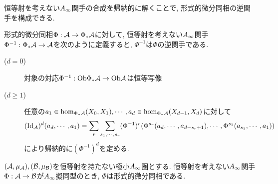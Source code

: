 \documentclass[uplatex, a4paper, 14Q, dvipdfmx]{jsarticle}
\begin{document}

恒等射を考えない$A_{\infty}$関手の合成を帰納的に解くことで, 形式的微分同相の逆関手を構成できる. 

\begin{lemma} \label{prop_diffeomorphism_has_inverse}
  形式的微分同相$\Phi: \mathcal{A} \to \Phi_\ast \mathcal{A}$に対して, 恒等射を考えない$A_{\infty}$関手$\Phi^{-1} : \Phi_\ast \mathcal{A} \to \mathcal{A}$を次のように定義すると, $\Phi^{-1}$は$\Phi$の逆関手である.
  \begin{description}
    \item[($d=0$)] 対象の対応$\Phi^{-1} : \mathrm{Ob}\Phi_\ast \mathcal{A} \to \mathrm{Ob}\mathcal{A}$は恒等写像
    \item[($d \geq 1$)] 任意の$a_1 \in \hom_{\Phi_\ast \mathcal{A}}(X_0,X_1), \cdots, a_d \in \hom_{\Phi_\ast \mathcal{A}}(X_{d-1},X_d)$に対して
    \begin{align*}
      (\mathrm{Id}_{\mathcal{A}})^d (a_d,\cdots,a_1)
      = \sum_r \sum_{s_1,\cdots,s_r} (\Phi^{-1})^r(\Phi^{s_r} (a_d,\cdots,a_{d-s_r+1}), \cdots, \Phi^{s_1}(a_{s_1},\cdots,a_1))
    \end{align*}
    により帰納的に$(\Phi^{-1})^d$を定める.
  \end{description}
\end{lemma}

\begin{example} \label{eg_Ainf_qis_with_zero_differential_is_formal_diffeo}
  $(\mathcal{A},\mu_{\mathcal{A}}), (\mathcal{B},\mu_{\mathcal{B}})$を恒等射を持たない極小$A_{\infty}$圏とする. 
  恒等射を考えない$A_{\infty}$関手$\Phi : \mathcal{A} \to \mathcal{B}$が$A_{\infty}$擬同型のとき, $\Phi$は形式的微分同相である. 
\end{example}



\end{document}
